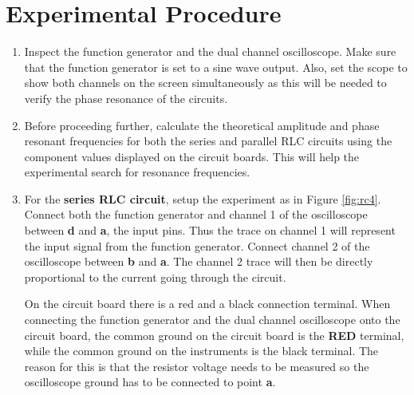 \section{Experimental Procedure} 
\begin{enumerate}
\item Inspect the function generator and the dual channel oscilloscope. Make sure that the function generator is set to a sine wave output. Also, set the scope to show both channels on the screen simultaneously as this will be needed to verify the phase resonance of the circuits.

\item Before proceeding further, calculate the theoretical amplitude and phase resonant frequencies for  both the series and parallel RLC circuits using the component values displayed on the circuit boards. This will help the experimental search for resonance frequencies.

\item For the {\bf series RLC circuit}, setup the experiment as in Figure \ref{fig:rc4}. Connect both the function generator and channel 1 of the oscilloscope between {\bf d} and {\bf a}, the input pins. Thus the trace on channel 1 will represent the input signal from the function generator. Connect channel 2 of the oscilloscope between {\bf b} and {\bf a}. The channel 2 trace will then be directly proportional to the current going through the circuit.

On the circuit board there is a red and a black connection terminal. When connecting the function generator and the dual channel oscilloscope onto the circuit board, the common ground on the circuit board is the {\bf RED} terminal, while the common ground on the instruments is the black terminal. The reason for this is that the resistor voltage needs to be measured so the oscilloscope ground has to be connected to point {\bf a}.

\begin{figure}
\end{figure}
\end{enumerate}
